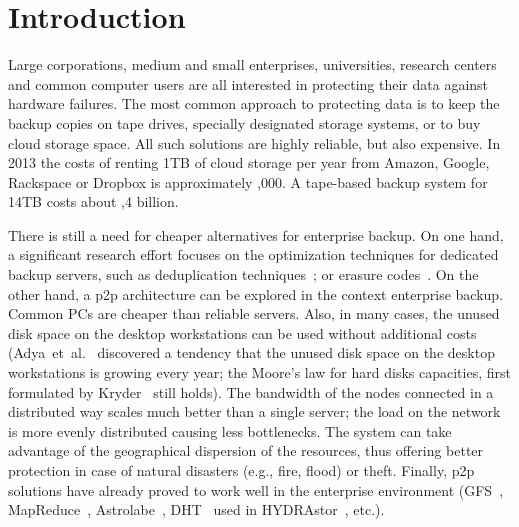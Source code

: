 \documentclass[10pt, final, conference, letterpaper]{IEEEtran}
\begin{document}
\section{Introduction}\label{sec::introduction}
Large corporations, medium and small enterprises, universities, research centers and common computer users are all interested in protecting their data against hardware failures.
The most common approach to protecting data is to keep the backup copies on tape drives, specially designated storage systems, or to buy cloud storage space. All such solutions are highly reliable, but also expensive. In 2013 the costs of renting 1TB of cloud storage per year from Amazon, Google, Rackspace or Dropbox is approximately ,000. A tape-based backup system for 14TB costs about \2,4 billion.

There is still a need for cheaper alternatives for enterprise backup. On one hand, a significant research effort focuses on the optimization techniques for dedicated backup servers, such as 
deduplication techniques~\cite{Meyer:2011:SPD:1960475.1960476, Dong:2011:TSD:1960475.1960477}; or erasure codes~\cite{conf/infocom/OggierD11, conf/icdcn/Pamies-JuarezOD13}. On the other hand, a p2p architecture can be explored in the context enterprise backup. Common PCs are cheaper than reliable servers. Also, in many cases, the unused disk space on the desktop workstations can be used without additional costs (Adya~et~al.~\cite{farsite} discovered a tendency that the unused disk space on the desktop workstations is growing every year; the Moore's law for hard disks capacities, first formulated by Kryder~\cite{citeulike:8870751} still holds). The bandwidth of the nodes connected in a distributed way scales much better than a single server; the load on the network is more evenly distributed causing less bottlenecks. The system can take advantage of the geographical dispersion of the resources, thus offering better protection in case of natural disasters (e.g., fire, flood) or theft. Finally, p2p solutions have already proved to work well in the enterprise environment (GFS~\cite{googlefs}, MapReduce~\cite{Dean:2008:MSD:1327452.1327492}, Astrolabe~\cite{Renesse01astrolabe:a}, DHT~\cite{dHash} used in HYDRAstor~\cite{hydraStore}, etc.).
\end{document}
